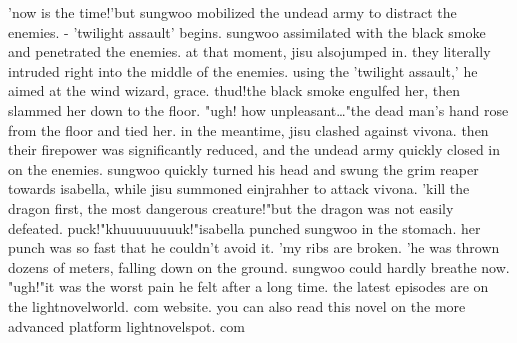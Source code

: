 'now is the time!'but sungwoo mobilized the undead army to distract the enemies.
- 'twilight assault' begins.
sungwoo assimilated with the black smoke and penetrated the enemies.
 at that moment, jisu alsojumped in.
 they literally intruded right into the middle of the enemies.
using the 'twilight assault,' he aimed at the wind wizard, grace.
thud!the black smoke engulfed her, then slammed her down to the floor.
"ugh! how unpleasant…"the dead man's hand rose from the floor and tied her.
 in the meantime, jisu clashed against vivona.
then their firepower was significantly reduced, and the undead army quickly closed in on the enemies.
sungwoo quickly turned his head and swung the grim reaper towards isabella, while jisu summoned einjrahher to attack vivona.
'kill the dragon first, the most dangerous creature!"but the dragon was not easily defeated.
puck!"khuuuuuuuuk!"isabella punched sungwoo in the stomach.
 her punch was so fast that he couldn't avoid it.
'my ribs are broken.
'he was thrown dozens of meters, falling down on the ground.
sungwoo could hardly breathe now.
 "ugh!"it was the worst pain he felt after a long time.
the latest episodes are on the lightnovelworld.
com website.
 you can also read this novel on the more advanced platform lightnovelspot.
com

 